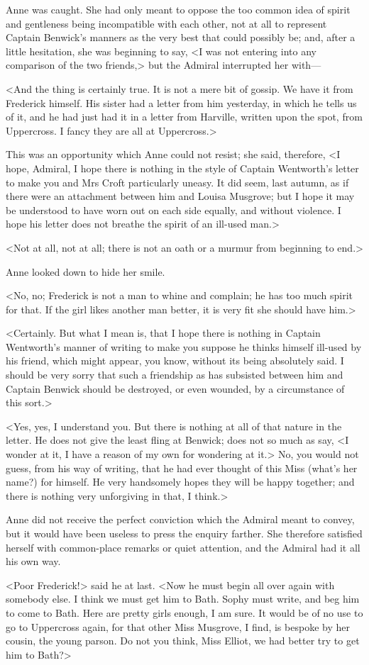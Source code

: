 Anne was caught. She had only meant to oppose the too common idea of spirit and gentleness being incompatible with each other, not at all to represent Captain Benwick's manners as the very best that could possibly be; and, after a little hesitation, she was beginning to say, <I was not entering into any comparison of the two friends,> but the Admiral interrupted her with—

<And the thing is certainly true. It is not a mere bit of gossip. We have it from Frederick himself. His sister had a letter from him yesterday, in which he tells us of it, and he had just had it in a letter from Harville, written upon the spot, from Uppercross. I fancy they are all at Uppercross.>

This was an opportunity which Anne could not resist; she said, therefore, <I hope, Admiral, I hope there is nothing in the style of Captain Wentworth's letter to make you and Mrs Croft particularly uneasy. It did seem, last autumn, as if there were an attachment between him and Louisa Musgrove; but I hope it may be understood to have worn out on each side equally, and without violence. I hope his letter does not breathe the spirit of an ill-used man.>

<Not at all, not at all; there is not an oath or a murmur from beginning to end.>

Anne looked down to hide her smile.

<No, no; Frederick is not a man to whine and complain; he has too much spirit for that. If the girl likes another man better, it is very fit she should have him.>

<Certainly. But what I mean is, that I hope there is nothing in Captain Wentworth's manner of writing to make you suppose he thinks himself ill-used by his friend, which might appear, you know, without its being absolutely said. I should be very sorry that such a friendship as has subsisted between him and Captain Benwick should be destroyed, or even wounded, by a circumstance of this sort.>

<Yes, yes, I understand you. But there is nothing at all of that nature in the letter. He does not give the least fling at Benwick; does not so much as say, <I wonder at it, I have a reason of my own for wondering at it.> No, you would not guess, from his way of writing, that he had ever thought of this Miss (what's her name?) for himself. He very handsomely hopes they will be happy together; and there is nothing very unforgiving in that, I think.>

Anne did not receive the perfect conviction which the Admiral meant to convey, but it would have been useless to press the enquiry farther. She therefore satisfied herself with common-place remarks or quiet attention, and the Admiral had it all his own way.

<Poor Frederick!> said he at last. <Now he must begin all over again with somebody else. I think we must get him to Bath. Sophy must write, and beg him to come to Bath. Here are pretty girls enough, I am sure. It would be of no use to go to Uppercross again, for that other Miss Musgrove, I find, is bespoke by her cousin, the young parson. Do not you think, Miss Elliot, we had better try to get him to Bath?>